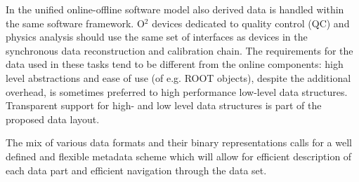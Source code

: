 \documentclass[a4paper,twoside]{article}
\def\O2{O$^2$}
\begin{document}
In the unified online-offline software model also derived data is handled within the same software framework. \O2 devices dedicated to quality control (QC) and physics analysis should use the same set of interfaces as devices in the synchronous data reconstruction and calibration chain. The requirements for the data used in these tasks tend to be different from the online components: high level abstractions and ease of use (of e.g. ROOT\cite{root} objects), despite the additional overhead, is sometimes preferred to high performance low-level data structures. Transparent support for high- and low level data structures is part of the proposed data layout.

The mix of various data formats and their binary representations calls for a well defined and flexible metadata scheme which will allow for efficient description of each data part and efficient navigation through the data set.
\end{document}
